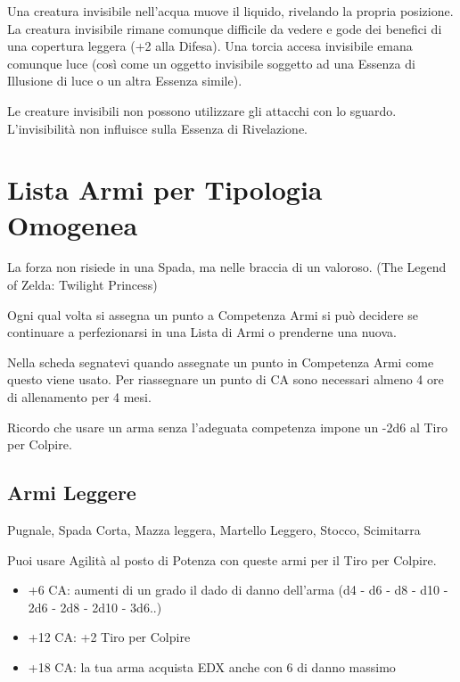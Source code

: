 \documentclass[a4paper,11pt,twoside,openany]{book}
\begin{document}
Una creatura invisibile nell'acqua muove il liquido, rivelando la propria posizione. La creatura invisibile rimane comunque difficile da vedere e gode dei benefici di una copertura leggera (+2 alla Difesa).
Una torcia accesa invisibile emana comunque luce (così come un oggetto invisibile soggetto ad una Essenza di Illusione di luce o un altra Essenza simile).

Le creature invisibili non possono utilizzare gli attacchi con lo sguardo. L'invisibilità non influisce sulla Essenza di Rivelazione.

\pagebreak

\section{Lista Armi per Tipologia Omogenea}

\label{lista-armi-per-tipologia-omogenea}
\begin{tcolorbox}[enhanced,arc=5pt,boxrule=0.3pt]{La forza non risiede in una Spada, ma nelle braccia di un valoroso. (The Legend of Zelda: Twilight Princess)}\end{tcolorbox}\medskip

Ogni qual volta si assegna un punto a Competenza Armi si può decidere se continuare a perfezionarsi in una Lista di Armi o prenderne una nuova.

Nella scheda segnatevi quando assegnate un punto in Competenza Armi come questo viene usato.
Per riassegnare un punto di CA sono necessari almeno 4 ore di allenamento per 4 mesi.

Ricordo che usare un arma senza l'adeguata competenza impone un -2d6 al Tiro per Colpire.

\subsection{Armi Leggere}Pugnale, Spada Corta, Mazza leggera, Martello Leggero, Stocco, Scimitarra

Puoi usare Agilità al posto di Potenza con queste armi per il Tiro per Colpire.

\begin{itemize}
	\item +6 CA: aumenti di un grado il dado di danno dell'arma (d4 - d6 - d8 - d10 - 2d6 - 2d8 - 2d10 - 3d6..)

	\item +12 CA: +2 Tiro per Colpire

	\item +18 CA: la tua arma acquista EDX anche con 6 di danno massimo
\end{itemize}
\end{document}
